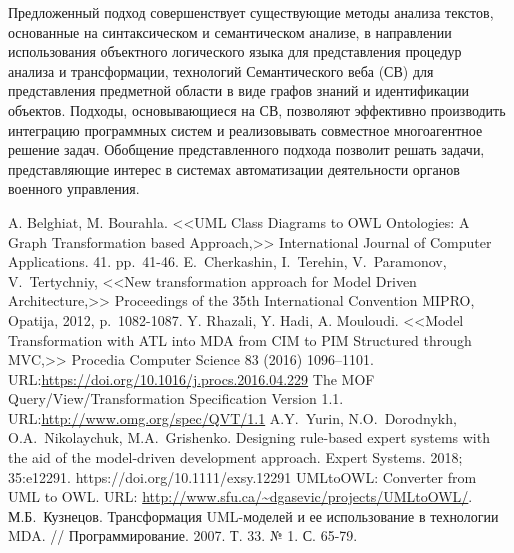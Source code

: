 \documentclass[12pt]{article}
\begin{document}
Предложенный подход совершенствует существующие методы анализа текстов, основанные на синтаксическом и семантическом анализе, в направлении использования объектного логического языка для представления процедур анализа и трансформации, технологий Семантического веба (СВ) для представления предметной области в виде графов знаний и идентификации объектов.  Подходы, основывающиеся на СВ, позволяют эффективно производить интеграцию программных систем и реализовывать совместное многоагентное решение задач.  Обобщение представленного подхода позволит решать задачи, представляющие
интерес в системах автоматизации деятельности органов военного управления.

\renewcommand\refname{\centering Литература}
\begin{thebibliography}{99}
 A. Belghiat, M. Bourahla. <<UML Class Diagrams to OWL Ontologies: A Graph Transformation based Approach,>> International Journal of Computer Applications. 41. pp.~41-46.
 E.~Cherkashin, I.~Terehin, V.~Paramonov, V.~Tertychniy, <<New transformation approach for Model Driven Architecture,>> Proceedings of the 35th International Convention MIPRO, Opatija, 2012, p.~1082-1087.
Y. Rhazali, Y. Hadi, A. Mouloudi. <<Model Transformation with ATL into MDA from CIM to PIM Structured through MVC,>> Procedia Computer Science 83 (2016) 1096–1101. URL:\url{https://doi.org/10.1016/j.procs.2016.04.229}
 The MOF Query/View/Transformation Specification Version 1.1. URL:\url{http://www.omg.org/spec/QVT/1.1}
 A.Y.~Yurin, N.O.~Dorodnykh, O.A.~Nikolaychuk, M.A.~Grishenko. Designing rule-based expert systems with the aid of the model-driven development approach. Expert Systems. 2018; 35:e12291. https://doi.org/10.1111/exsy.12291
 UMLtoOWL: Converter from UML to OWL. URL: \url{http://www.sfu.ca/~dgasevic/projects/UMLtoOWL/}.
М.Б.~Кузнецов. Трансформация UML-моделей и ее использование в технологии MDA. // Программирование. 2007. Т. 33. № 1. С. 65-79.


\end{thebibliography}
\end{document}
